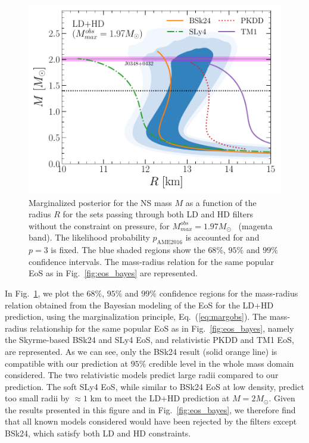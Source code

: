 \begin{figure}[!t]
\begin{center}
  \includegraphics[width=0.9\linewidth]{figures/mr_bayes.pdf}
\end{center}
\caption[Posterior mass-radius relation confronted with popular models and 
the GW170817 event]{Marginalized posterior for the NS mass $M$ as a function of 
  the radius $R$ for the sets passing through both LD and HD filters without 
  the constraint on pressure, for $M_{max}^{obs} =
  1.97M_\odot$~\cite{Antoniadis2013} (magenta band). The likelihood 
  probability $p_{\text{AME2016}}$ is accounted for and $p=3$ is fixed. The 
  blue shaded regions show the $68\%$, $95\%$ and $99\%$ confidence 
  intervals. The mass-radius relation for the same popular EoS as in 
Fig.~\ref{fig:eos_bayes} are represented.}\label{fig:mr_bayes}
\end{figure}
 
In Fig.~\ref{fig:mr_bayes}, we plot the $68\%$, $95\%$ and $99\%$ 
confidence regions for the mass-radius relation obtained from the Bayesian
modeling of the EoS for the LD+HD prediction, using the marginalization 
principle, Eq.~(\ref{eq:margobs}). The mass-radius relationship for the same 
popular EoS as in Fig.~\ref{fig:eos_bayes}, namely the 
Skyrme-based BSk24 and SLy4 EoS, and relativistic PKDD and TM1 EoS, are 
represented. As we can see, only the BSk24 result (solid orange line) is 
compatible with our prediction at $95\%$ credible level in the whole mass 
domain considered. The two relativistic models predict large radii compared to 
our prediction. The soft SLy4 EoS, while similar to BSk24 EoS at low density, 
predict too small radii by $\approx 1$ km to meet the LD+HD prediction at 
$M = 2M_\odot$. Given the results presented in this figure and in
Fig.~\ref{fig:eos_bayes}, we therefore find that all known models considered 
would have been rejected by the filters except BSk24, which satisfy both LD and
HD constraints.

